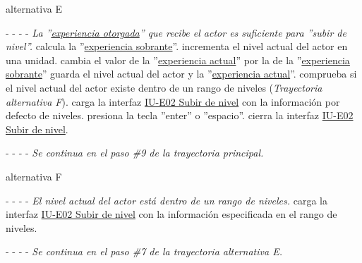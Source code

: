 \begin{UCtrayectoria}{alternativa E}
    \item[- -] - - {\em La ''\hyperref[table:METerminosExperiencia1]{experiencia otorgada}'' que recibe el actor es suficiente para ''subir de nivel''.}
    \sistema calcula la ''\hyperref[table:METerminosExperiencia2]{experiencia sobrante}''.
    \sistema incrementa el nivel actual del actor en una unidad.
    \sistema cambia el valor de la ''\hyperref[table:METerminosExperiencia1]{experiencia actual}'' por la de la ''\hyperref[table:METerminosExperiencia1]{experiencia sobrante}''
    \sistema guarda el nivel actual del actor y la ''\hyperref[table:METerminosExperiencia1]{experiencia actual}''.
    \sistema comprueba si el nivel actual del actor existe dentro de un rango de niveles ({\it Trayectoria alternativa F}).
    \sistema carga la interfaz \hyperref[IUE02]{IU-E02 Subir de nivel} con la información por defecto de niveles.
    \actor presiona la tecla ''enter'' o ''espacio''.
    \sistema cierra la interfaz \hyperref[IUE02]{IU-E02 Subir de nivel}.
    \item[- -] - - {\em Se continua en el paso \#9 de la trayectoria principal.}
\end{UCtrayectoria}


\begin{UCtrayectoria}{alternativa F}
    \item[- -] - - {\em El nivel actual del actor está dentro de un rango de niveles.}
    \sistema carga la interfaz \hyperref[IUE02]{IU-E02 Subir de nivel}  con la información especificada en el rango de niveles.
    \item[- -] - - {\em Se continua en el paso \#7 de la trayectoria alternativa E.}
\end{UCtrayectoria}

\vfill\clearpage